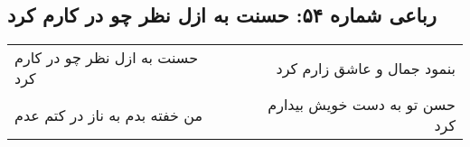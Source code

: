 \begin{center}
\section*{رباعی شماره ۵۴: حسنت به ازل نظر چو در کارم کرد}
\label{sec:054}
\begin{longtable}{l p{0.5cm} r}
حسنت به ازل نظر چو در کارم کرد
&&
بنمود جمال و عاشق زارم کرد
\\
من خفته بدم به ناز در کتم عدم
&&
حسن تو به دست خویش بیدارم کرد
\\
\end{longtable}
\end{center}
